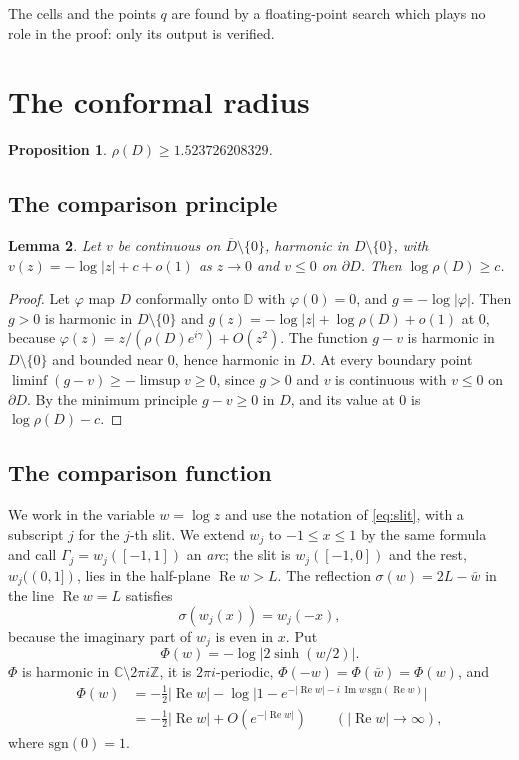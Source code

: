 \documentclass[11pt]{amsart}
\newtheorem{proposition}{Proposition}[section]
\newtheorem{lemma}[proposition]{Lemma}
\theoremstyle{remark}
\newcommand{\D}{\mathbb D}
\newcommand{\C}{\mathbb C}
\newcommand{\Z}{\mathbb Z}
\newcommand{\re}{\operatorname{Re}}
\newcommand{\im}{\operatorname{Im}}
\begin{document}
The cells and the points $q$ are found by a floating-point search which plays no role in the proof: only its
output is verified.

\section{The conformal radius}\label{sec:rho}

\begin{proposition}\label{prop:rho}
$\rho(D)\ge1.523726208329$.
\end{proposition}

\subsection{The comparison principle}

\begin{lemma}\label{lem:comparison}
Let $v$ be continuous on $\overline D\setminus\{0\}$, harmonic in $D\setminus\{0\}$, with
$v(z)=-\log|z|+c+o(1)$ as $z\to0$ and $v\le0$ on $\partial D$. Then $\log\rho(D)\ge c$.
\end{lemma}

\begin{proof}
Let $\varphi$ map $D$ conformally onto $\D$ with $\varphi(0)=0$, and $g=-\log|\varphi|$. Then $g>0$ is harmonic in
$D\setminus\{0\}$ and $g(z)=-\log|z|+\log\rho(D)+o(1)$ at $0$, because $\varphi(z)=z/(\rho(D)e^{i\gamma})+O(z^2)$.
The function $g-v$ is harmonic in $D\setminus\{0\}$ and bounded near $0$, hence harmonic in $D$. At every boundary
point $\liminf(g-v)\ge-\limsup v\ge0$, since $g>0$ and $v$ is continuous with $v\le0$ on $\partial D$. By the
minimum principle $g-v\ge0$ in $D$, and its value at $0$ is $\log\rho(D)-c$.
\end{proof}

\subsection{The comparison function}\label{sec:U}

We work in the variable $w=\log z$ and use the notation of \eqref{eq:slit}, with a subscript $j$ for the $j$-th
slit. We extend $w_j$ to $-1\le x\le1$ by the same formula and call $\Gamma_j=w_j([-1,1])$ an \emph{arc}; the slit
is $w_j([-1,0])$ and the rest, $w_j((0,1])$, lies in the half-plane $\re w>L$. The reflection
$\sigma(w)=2L-\bar w$ in the line $\re w=L$ satisfies
\begin{equation}\label{eq:sigma}
\sigma(w_j(x))=w_j(-x),
\end{equation}
because the imaginary part of $w_j$ is even in $x$. Put
\[
\Phi(w)=-\log\bigl|2\sinh(w/2)\bigr| .
\]
$\Phi$ is harmonic in $\C\setminus2\pi i\Z$, it is $2\pi i$-periodic, $\Phi(-w)=\Phi(\bar w)=\Phi(w)$, and
\begin{equation}\label{eq:phi-asym}
\begin{aligned}
\Phi(w)&=-\tfrac12|\re w|-\log\bigl|1-e^{-|\re w|-i\,\im w\,\mathrm{sgn}(\re w)}\bigr|\\
&=-\tfrac12|\re w|+O(e^{-|\re w|})\qquad(|\re w|\to\infty),
\end{aligned}
\end{equation}
where $\mathrm{sgn}(0)=1$.
\end{document}
